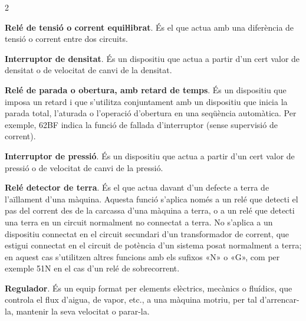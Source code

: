 \begin{multicols}{2}
\begin{list}{}
		\item[\textbf{60}]   
		\textbf{Relé de tensió o corrent equiŀlibrat}. És el que actua amb una diferència de tensió o
		corrent entre dos circuits.
		
		\item[\textbf{61}] 
		\textbf{Interruptor de densitat}. És un dispositiu que actua a partir d'un cert valor de densitat o de velocitat de canvi de la densitat.
		
		
		\item[\textbf{62}]   
		\textbf{Relé de parada o obertura, amb retard de temps}. És un dispositiu que imposa un retard i que s'utilitza
		conjuntament amb un dispositiu que inicia la parada total, l'aturada o l'operació
		d'obertura en una seqüència automàtica. Per exemple, 62BF indica la funció de fallada d'interruptor (sense supervisió de corrent).
		
		\item[\textbf{63}]   
		\textbf{Interruptor de pressió}. És un dispositiu que actua a partir d'un cert valor de pressió o de velocitat de canvi de la pressió.
		
		\item[\textbf{64}]    
		\textbf{Relé detector de terra}.
		És el que actua davant d'un defecte a terra de l'aïllament d'una
		màquina. Aquesta funció s'aplica només a un relé que detecti el pas
		del corrent des de la carcassa  d'una màquina a terra, o a un relé
		que detecti una terra en un circuit normalment no connectat a terra. No
		s'aplica a un dispositiu connectat en el circuit secundari d'un
		transformador de corrent, que estigui connectat en el circuit de
		potència d'un sistema posat normalment a terra; en aquest cas s'utilitzen altres funcions amb els sufixos «N» o «G», com  per exemple 51N en el cas d'un relé de sobrecorrent.
		
		\item[\textbf{65}]   
		\textbf{Regulador}. És un equip format per elements
		elèctrics, mecànics o fluídics,  que controla el flux d'aigua, de
		vapor, etc.,  a una màquina motriu, per tal d'arrencar-la, mantenir
		la seva velocitat o parar-la.
		

\end{list}
\end{multicols}
